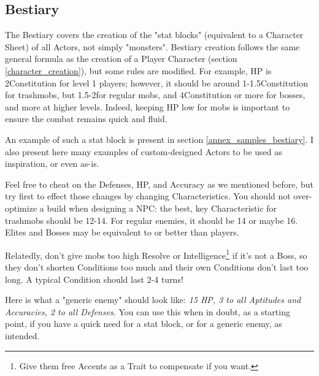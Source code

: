 \subsection{Bestiary}

\label{bestiary}

The Bestiary covers the creation of the "stat blocks" (equivalent to a Character Sheet) of all Actors, not simply "monsters". Bestiary creation follows the same general formula as the creation of a Player Character (section \ref{character_creation}), but some rules are modified. For example, HP is 2\texttimes Constitution for level 1 players; however, it should be around 1-1.5\texttimes Constitution for trashmobs, but 1.5-2\texttimes for regular mobs, and 4\texttimes Constitution or more for bosses, and more at higher levels. Indeed, keeping HP low for mobs is important to ensure the combat remains quick and fluid.


\begin{rpg-examplebox}
    An example of such a stat block is present in section \ref{annex_samples_bestiary}. I also present here many examples of custom-designed Actors to be used as inspiration, or even as-is.
\end{rpg-examplebox}


Feel free to cheat on the Defenses, HP, and Accuracy as we mentioned before, but try first to effect those changes by changing Characteristics. You should not over-optimize a build when designing a NPC: the best, key Characteristic for trashmobs should be 12-14. For regular enemies, it should be 14 or maybe 16. Elites and Bosses may be equivalent to or better than players. 

Relatedly, don't give mobs too high Resolve or Intelligence\footnote{Give them free Accents as a Trait to compensate if you want.} if it's not a Boss, so they don't shorten Conditions too much and their own Conditions don't last too long. A typical Condition should last 2-4 turns!


\begin{rpg-examplebox}
    Here is what a "generic enemy" should look like: \textit{15 HP, 3 to all Aptitudes and Accuracies, 2 to all Defenses}. You can use this when in doubt, as a starting point, if you have a quick need for a stat block, or for a generic enemy, as intended.
\end{rpg-examplebox}

